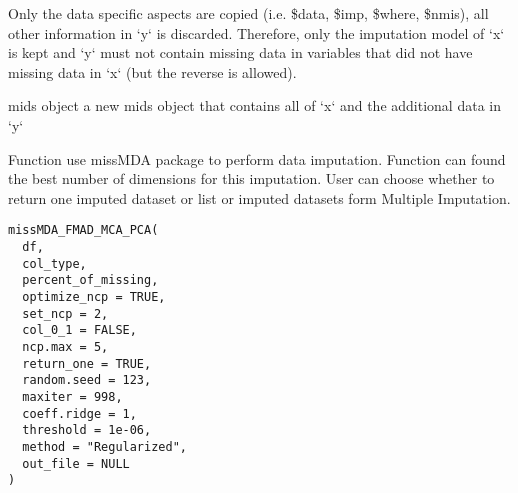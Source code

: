 \documentclass[letterpaper]{book}
\begin{document}
%
\begin{Details}\relax
  Only the data specific aspects are copied (i.e. \$data, \$imp, \$where,
\$nmis), all other information in `y` is discarded. Therefore, only
the imputation model of `x` is kept and `y` must not contain missing
data in variables that did not have missing data in `x` (but the
reverse is allowed).

\end{Details}
%
\begin{Value}
mids object
a new mids object that contains all of `x` and the additional data in `y`
\end{Value}
%
\begin{Description}\relax
Function use missMDA package to perform data imputation. Function can found the best number of dimensions for this imputation.
User can choose whether to return one imputed dataset or list or imputed datasets form Multiple Imputation.
\end{Description}
%
\begin{Usage}
\begin{verbatim}
missMDA_FMAD_MCA_PCA(
  df,
  col_type,
  percent_of_missing,
  optimize_ncp = TRUE,
  set_ncp = 2,
  col_0_1 = FALSE,
  ncp.max = 5,
  return_one = TRUE,
  random.seed = 123,
  maxiter = 998,
  coeff.ridge = 1,
  threshold = 1e-06,
  method = "Regularized",
  out_file = NULL
)
\end{verbatim}
\end{Usage}
%
\end{document}
